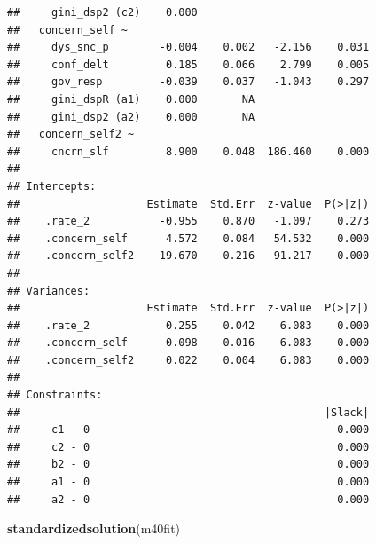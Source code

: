 \documentclass[
]{article}
\newenvironment{Shaded}{\begin{snugshade}}{\end{snugshade}}
\newcommand{\KeywordTok}[1]{\textcolor[rgb]{0.13,0.29,0.53}{\textbf{#1}}}
\newcommand{\NormalTok}[1]{#1}
\begin{document}
\begin{verbatim}
##     gini_dsp2 (c2)    0.000                           
##   concern_self ~                                      
##     dys_snc_p        -0.004    0.002   -2.156    0.031
##     conf_delt         0.185    0.066    2.799    0.005
##     gov_resp         -0.039    0.037   -1.043    0.297
##     gini_dspR (a1)    0.000       NA                  
##     gini_dsp2 (a2)    0.000       NA                  
##   concern_self2 ~                                     
##     cncrn_slf         8.900    0.048  186.460    0.000
## 
## Intercepts:
##                    Estimate  Std.Err  z-value  P(>|z|)
##    .rate_2           -0.955    0.870   -1.097    0.273
##    .concern_self      4.572    0.084   54.532    0.000
##    .concern_self2   -19.670    0.216  -91.217    0.000
## 
## Variances:
##                    Estimate  Std.Err  z-value  P(>|z|)
##    .rate_2            0.255    0.042    6.083    0.000
##    .concern_self      0.098    0.016    6.083    0.000
##    .concern_self2     0.022    0.004    6.083    0.000
## 
## Constraints:
##                                                |Slack|
##     c1 - 0                                       0.000
##     c2 - 0                                       0.000
##     b2 - 0                                       0.000
##     a1 - 0                                       0.000
##     a2 - 0                                       0.000
\end{verbatim}

\begin{Shaded}
\begin{Highlighting}[]
\KeywordTok{standardizedsolution}\NormalTok{(m40fit)}
\end{Highlighting}
\end{Shaded}
\end{document}
